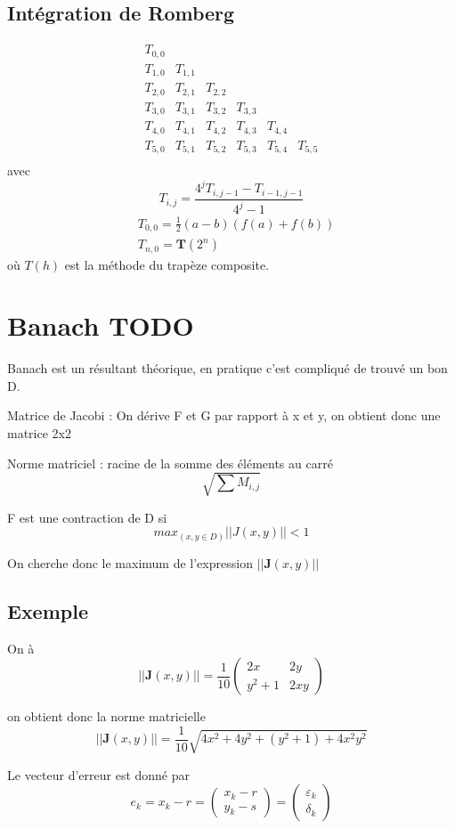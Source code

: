 \documentclass[a4paper,9pt]{extarticle}
\begin{document}
\section{Intégration de Romberg}
$$
\begin{array}{cccccc}
T_{0,0} & & & & & \\
T_{1,0} & T_{1,1} & & & & \\
T_{2,0} & T_{2,1} & T_{2,2} & & & \\
T_{3,0} & T_{3,1} & T_{3,2} & T_{3,3} & & \\
T_{4,0} & T_{4,1} & T_{4,2} & T_{4,3} & T_{4,4} & \\
T_{5,0} & T_{5,1} & T_{5,2} & T_{5,3} & T_{5,4} & T_{5,5} \\
\end{array}
$$
avec
$$
T_{i,j}=\frac{4^jT_{i,j-1}-T_{i-1,j-1}}{4^j-1}
$$
\begin{align*}
& T_{0,0}=\frac{1}{2}(a-b)(f(a)+f(b))\\
& T_{n,0}=\textbf{T}(2^n)
\end{align*}
où $T(h)$ est la méthode du trapèze composite.

\chapter{Banach TODO}

Banach est un résultant théorique, en pratique c'est compliqué de trouvé un bon D.

Matrice de Jacobi : On dérive F et G par rapport à x et y, on obtient donc une matrice 2x2

Norme matriciel : racine de la somme des éléments au carré
$$\sqrt{\sum{M_{i,j}}}$$

F est une contraction de D si
$$
max_{(x,y\in D)} ||J(x,y)|| < 1
$$

On cherche donc le maximum de l'expression $||\textbf{J}(x,y)||$
\section{Exemple}
On à $$||\textbf{J}(x,y)|| = \frac{1}{10}(\begin{array}{cc}
2x & 2y \\ 
y^2+1 & 2xy
\end{array})$$

on obtient donc la norme matricielle
$$
||\textbf{J}(x,y)|| = \frac{1}{10}\sqrt{4x^2+4y^2+(y^2+1)+4x^2y^2}
$$

Le vecteur d'erreur est donné par
$$
e_k = x_k - r = (\begin{array}{c}
x_k-r \\ 
y_k-s
\end{array} ) = (\begin{matrix}
\varepsilon_k \\ 
\delta_k
\end{matrix})
$$
\end{document}
